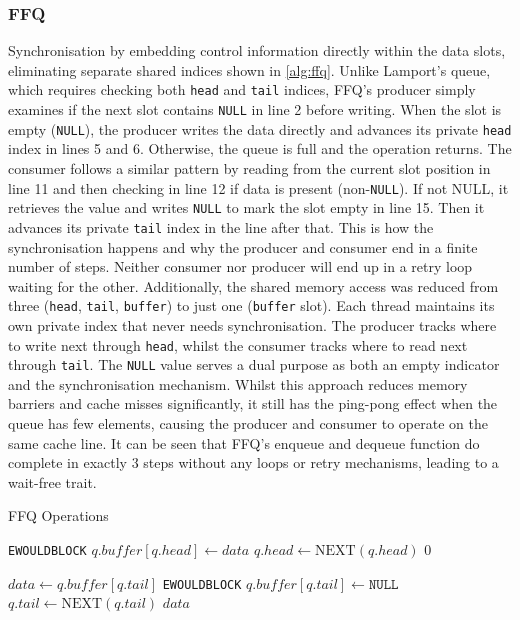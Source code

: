 \subsubsection{\acf{FFQ}}
Synchronisation by embedding control information directly within the data slots, eliminating separate shared indices shown in \cref{alg:ffq}. Unlike Lamport's queue, which requires checking both \texttt{head} and \texttt{tail} indices, \ac{FFQ}'s producer simply examines if the next slot contains \texttt{NULL} in line 2 before writing. When the slot is empty (\texttt{NULL}), the producer writes the data directly and advances its private \texttt{head} index in lines 5 and 6. Otherwise, the queue is full and the operation returns. The consumer follows a similar pattern by reading from the current slot position in line 11 and then checking in line 12 if data is present (non-\texttt{NULL}). If not NULL, it retrieves the value and writes \texttt{NULL} to mark the slot empty in line 15. Then it advances its private \texttt{tail} index in the line after that. This is how the synchronisation happens and why the producer and consumer end in a finite number of steps. Neither consumer nor producer will end up in a retry loop waiting for the other. Additionally, the shared memory access was reduced from three (\texttt{head}, \texttt{tail}, \texttt{buffer}) to just one (\texttt{buffer} slot). Each thread maintains its own private index that never needs synchronisation. The producer tracks where to write next through \texttt{head}, whilst the consumer tracks where to read next through \texttt{tail}. The \texttt{NULL} value serves a dual purpose as both an empty indicator and the synchronisation mechanism. Whilst this approach reduces memory barriers and cache misses significantly, it still has the ping-pong effect when the queue has few elements, causing the producer and consumer to operate on the same cache line. It can be seen that \ac{FFQ}'s enqueue and dequeue function do complete in exactly 3 steps without any loops or retry mechanisms, leading to a wait-free trait. \cite{ffq} 

\begin{algorithm}[!ht]
    \centering
    \captionsetup{justification=centering}
    \caption{\ac{FFQ} Operations \cite{ffq}}
    \label{alg:ffq}
    \scriptsize
    \begin{algorithmic}[1]
                \State \Return \texttt{EWOULDBLOCK}
            \EndIf
            \State $q.buffer[q.head] \gets data$
            \State $q.head \gets \text{NEXT}(q.head)$
            \State \Return $0$
        \EndFunction
        
        \State
        
            \State $data \gets q.buffer[q.tail]$
                \State \Return \texttt{EWOULDBLOCK}
            \EndIf
            \State $q.buffer[q.tail] \gets \texttt{NULL}$
            \State $q.tail \gets \text{NEXT}(q.tail)$
            \State \Return $data$
        \EndFunction
    \end{algorithmic}
\end{algorithm}


